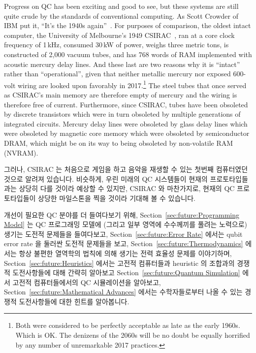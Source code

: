 Progress on QC has been exciting and good to see, but these systems are
still quite crude by the standards of conventional computing.
As Scott Crowder of IBM put it,
``It's the 1940s again''~\cite{BradJones2017IBM-QC-Crowder}.
For purposes of comparison, the oldest intact computer, the
University of Melbourne's 1949
CSIRAC~\cite{CSIRACMuseumVictoria,CSIRACUniversityMelbourne},
ran at a core clock frequency of 1\,kHz, consumed 30\,kW of power,
weighs three metric tons,
is constructed of 2,000 vacuum tubes, and has 768 words of RAM
implemented with acoustic mercury delay lines.
And these last are two reasons why it is ``intact'' rather than
``operational'', given that
neither metallic mercury nor exposed 600-volt wiring are
looked upon favorably in 2017.\footnote{
	Both were considered to be perfectly acceptable as late as the
	early 1960s.
	Which is OK.
	The denizens of the 2060s will be no doubt be equally horrified
	by any number of unremarkable 2017 practices.}
The steel tubes that once served as CSIRAC's main memory are therefore
empty of mercury and the wiring is therefore free of current.
Furthermore, since CSIRAC, tubes have been obsoleted by discrete
transistors which were in turn obsoleted by multiple generations of
integrated circuits.
Mercury delay lines were obsoleted by glass delay lines which were
obsoleted by magnetic core memory which were obsoleted by
semiconductor DRAM, which might be on its way to being obsoleted
by non-volatile RAM (NVRAM).
\fi

그러나, CSIRAC 는 처음으로 게임을 하고 음악을 재생할 수 있는 첫번째 컴퓨터였던
것으로 알려져 있습니다.
비슷하게, 우린 미래의 QC 시스템들이 현재의 프로토타입들과는 상당히 다를 것이라
예상할 수 있지만, CSIRAC 와 마찬가지로, 현재의 QC 프로토타입들이 상당한
마일스톤을 찍을 것이라 기대해 볼 수 있습니다.

개선이 필요한 QC 분야를 더 들여다보기 위해,
Section~\ref{sec:future:Programming Model} 는 QC 프로그래밍 모델에 (그리고 일부
영역에 수수께끼를 풀려는 노력으로) 생기는 도전적 문제들을 들여다보고,
Section~\ref{sec:future:Error Rate} 에서는 qubit error rate 을 둘러싼 도전적
문제들을 보고,
Section~\ref{sec:future:Thermodynamics} 에서는 항상 불편한 열역학의 법칙에 의해
생기는 전력 효율성 문제를 이야기하며,
Section~\ref{sec:future:Heuristics} 에서는 고전적 컴퓨터들과 heuristic 의
조합과의 경쟁적 도전사항들에 대해 간략히 알아보고
Section~\ref{sec:future:Quantum Simulation} 에서 고전적 컴퓨터들에서의 QC
시뮬레이션을 알아보고,
Section~\ref{sec:future:Mathematical Advances} 에서는 수학자들로부터 나올 수
있는 경쟁적 도전사항들에 대한 힌트를 알아봅니다.
\iffalse

